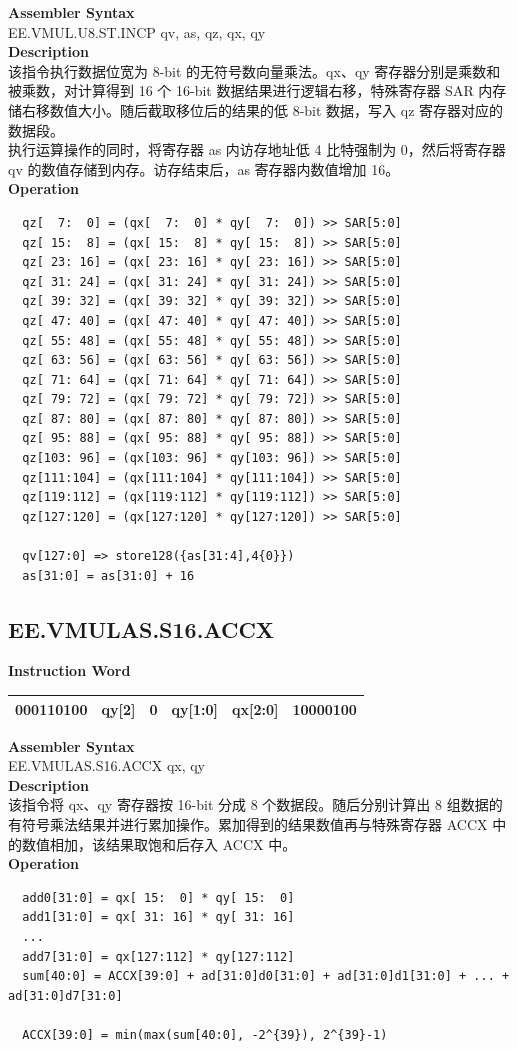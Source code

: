 \textbf{Assembler Syntax} \\
EE.VMUL.U8.ST.INCP qv, as, qz, qx, qy \\
\textbf{Description} \\
该指令执行数据位宽为 8-bit 的无符号数向量乘法。qx、qy 寄存器分别是乘数和被乘数，对计算得到 16 个 16-bit 数据结果进行逻辑右移，特殊寄存器 SAR 内存储右移数值大小。随后截取移位后的结果的低 8-bit 数据，写入 qz 寄存器对应的数据段。\\ 执行运算操作的同时，将寄存器 as 内访存地址低 4 比特强制为 0，然后将寄存器 qv 的数值存储到内存。访存结束后，as 寄存器内数值增加 16。\\
\textbf{Operation}
\begin{lstlisting}
  qz[  7:  0] = (qx[  7:  0] * qy[  7:  0]) >> SAR[5:0]
  qz[ 15:  8] = (qx[ 15:  8] * qy[ 15:  8]) >> SAR[5:0]
  qz[ 23: 16] = (qx[ 23: 16] * qy[ 23: 16]) >> SAR[5:0]
  qz[ 31: 24] = (qx[ 31: 24] * qy[ 31: 24]) >> SAR[5:0]
  qz[ 39: 32] = (qx[ 39: 32] * qy[ 39: 32]) >> SAR[5:0]
  qz[ 47: 40] = (qx[ 47: 40] * qy[ 47: 40]) >> SAR[5:0]
  qz[ 55: 48] = (qx[ 55: 48] * qy[ 55: 48]) >> SAR[5:0]
  qz[ 63: 56] = (qx[ 63: 56] * qy[ 63: 56]) >> SAR[5:0]
  qz[ 71: 64] = (qx[ 71: 64] * qy[ 71: 64]) >> SAR[5:0]
  qz[ 79: 72] = (qx[ 79: 72] * qy[ 79: 72]) >> SAR[5:0]
  qz[ 87: 80] = (qx[ 87: 80] * qy[ 87: 80]) >> SAR[5:0]
  qz[ 95: 88] = (qx[ 95: 88] * qy[ 95: 88]) >> SAR[5:0]
  qz[103: 96] = (qx[103: 96] * qy[103: 96]) >> SAR[5:0]
  qz[111:104] = (qx[111:104] * qy[111:104]) >> SAR[5:0]
  qz[119:112] = (qx[119:112] * qy[119:112]) >> SAR[5:0]
  qz[127:120] = (qx[127:120] * qy[127:120]) >> SAR[5:0]

  qv[127:0] => store128({as[31:4],4{0}})
  as[31:0] = as[31:0] + 16
\end{lstlisting}

\clearpage
\subsection{EE.VMULAS.S16.ACCX}\label{instruction:EEVMULASS16ACCX}
\setlength\tabcolsep{6pt}
\textbf{Instruction Word} \\
\begin{tabular}{|c|c|c|c|c|c|}
	\hline
	000110100 & qy[2] & 0 & qy[1:0] & qx[2:0] & 10000100 \\
	\hline
\end{tabular}

\textbf{Assembler Syntax} \\
EE.VMULAS.S16.ACCX qx, qy \\
\textbf{Description} \\
该指令将 qx、qy 寄存器按 16-bit 分成 8 个数据段。随后分别计算出 8 组数据的有符号乘法结果并进行累加操作。累加得到的结果数值再与特殊寄存器 ACCX 中的数值相加，该结果取饱和后存入 ACCX 中。\\
\textbf{Operation}
\begin{lstlisting}
  add0[31:0] = qx[ 15:  0] * qy[ 15:  0]
  add1[31:0] = qx[ 31: 16] * qy[ 31: 16]
  ...
  add7[31:0] = qx[127:112] * qy[127:112]
  sum[40:0] = ACCX[39:0] + ad[31:0]d0[31:0] + ad[31:0]d1[31:0] + ... + ad[31:0]d7[31:0]

  ACCX[39:0] = min(max(sum[40:0], -2^{39}), 2^{39}-1)
\end{lstlisting}

